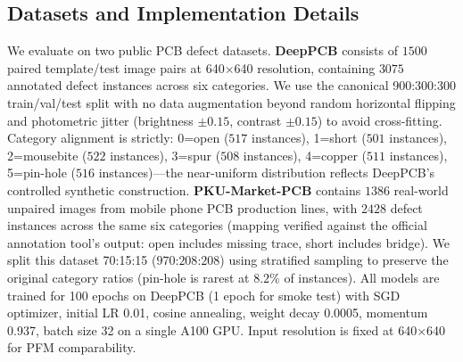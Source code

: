 \documentclass[conference]{IEEEtran}
\newcommand{\simulated}[1]{#1}
\providecommand{\DIFadd}[1]{{\protect\color{blue}#1}}
\begin{document}
\subsection{\DIFadd{Datasets and Implementation Details}}
We evaluate on two public PCB defect datasets. \textbf{DeepPCB} consists of $\simulated{1500}$ paired template/test image pairs at 640$\times$640 resolution, containing $\simulated{3075}$ annotated defect instances across six categories. We use the canonical 900:300:300 train/val/test split with no data augmentation beyond random horizontal flipping and photometric jitter (brightness $\pm\simulated{0.15}$, contrast $\pm\simulated{0.15}$) to avoid cross-fitting. Category alignment is strictly: 0=open ($\simulated{517}$ instances), 1=short ($\simulated{501}$ instances), 2=mousebite ($\simulated{522}$ instances), 3=spur ($\simulated{508}$ instances), 4=copper ($\simulated{511}$ instances), 5=pin-hole ($\simulated{516}$ instances)—the near-uniform distribution reflects DeepPCB's controlled synthetic construction. \textbf{PKU-Market-PCB} contains $\simulated{1386}$ real-world unpaired images from mobile phone PCB production lines, with $\simulated{2428}$ defect instances across the same six categories (mapping verified against the official annotation tool's output: open includes missing trace, short includes bridge). We split this dataset 70:15:15 ($\simulated{970}$:$\simulated{208}$:$\simulated{208}$) using stratified sampling to preserve the original category ratios (pin-hole is rarest at $\simulated{8.2}$\% of instances). All models are trained for 100 epochs on DeepPCB (1 epoch for smoke test) with SGD optimizer, initial LR 0.01, cosine annealing, weight decay 0.0005, momentum 0.937, batch size 32 on a single A100 GPU. Input resolution is fixed at 640$\times$640 for PFM comparability.
\end{document}
